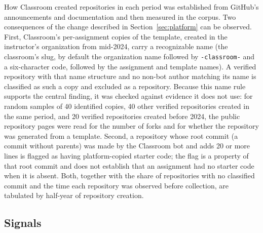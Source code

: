\documentclass[acmsmall,screen,review,anonymous]{acmart}
\begin{document}
How Classroom created repositories in each period was established from GitHub's announcements and documentation \citep{github2023classroomchanges, github2024forksbeta, github2024forksga, githubdocs2026template} and then measured in the corpus. Two consequences of the change described in Section~\ref{sec:platform} can be observed. First, Classroom's per-assignment copies of the template, created in the instructor's organization from mid-2024, carry a recognizable name (the classroom's slug, by default the organization name followed by \texttt{-classroom-} and a six-character code, followed by the assignment and template names). A verified repository with that name structure and no non-bot author matching its name is classified as such a copy and excluded as a repository. Because this name rule supports the central finding, it was checked against evidence it does not use: for random samples of 40 identified copies, 40 other verified repositories created in the same period, and 20 verified repositories created before 2024, the public repository pages were read for the number of forks and for whether the repository was generated from a template. Second, a repository whose root commit (a commit without parents) was made by the Classroom bot and adds 20 or more lines is flagged as having platform-copied starter code; the flag is a property of that root commit and does not establish that an assignment had no starter code when it is absent. Both, together with the share of repositories with no classified commit and the time each repository was observed before collection, are tabulated by half-year of repository creation.

\subsection{Signals}
\label{sec:signals}
\end{document}
